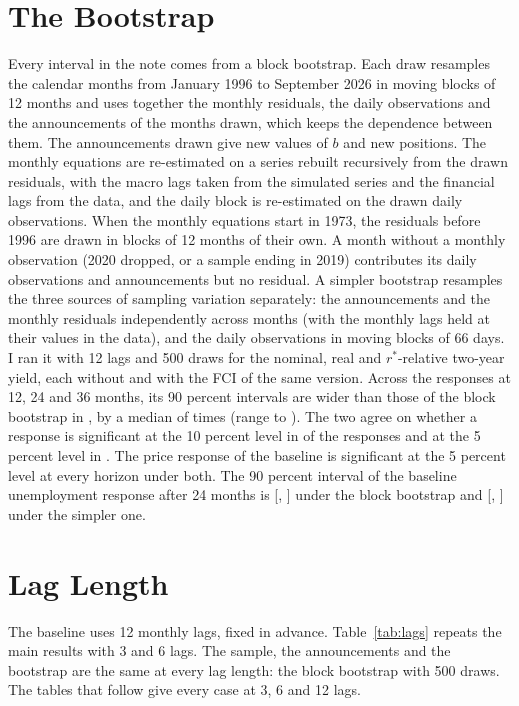 \documentclass[11pt]{article}
\newcommand{\rs}{r^{*}}
\begin{document}
\begin{appendices}
\section{The Bootstrap}\label{app:boot}
Every interval in the note comes from a block bootstrap. Each draw resamples the calendar months from January 1996 to September 2026 in moving blocks of 12 months and uses together the monthly residuals, the daily observations and the announcements of the months drawn, which keeps the dependence between them. The announcements drawn give new values of $b$ and new positions. The monthly equations are re-estimated on a series rebuilt recursively from the drawn residuals, with the macro lags taken from the simulated series and the financial lags from the data, and the daily block is re-estimated on the drawn daily observations. When the monthly equations start in 1973, the residuals before 1996 are drawn in blocks of 12 months of their own. A month without a monthly observation (2020 dropped, or a sample ending in 2019) contributes its daily observations and announcements but no residual. A simpler bootstrap resamples the three sources of sampling variation separately: the announcements and the monthly residuals independently across months (with the monthly lags held at their values in the data), and the daily observations in moving blocks of 66 days. I ran it with 12 lags and 500 draws for the nominal, real and $\rs$-relative two-year yield, each without and with the FCI of the same version. Across the  responses at 12, 24 and 36 months, its 90 percent intervals are wider than those of the block bootstrap in , by a median of  times (range  to ). The two agree on whether a response is significant at the 10 percent level in  of the  responses and at the 5 percent level in . The price response of the baseline is significant at the 5 percent level at every horizon under both. The 90 percent interval of the baseline unemployment response after 24 months is [, ] under the block bootstrap and [, ] under the simpler one.

\FloatBarrier
\section{Lag Length}\label{app:lags}
The baseline uses 12 monthly lags, fixed in advance. Table~\ref{tab:lags} repeats the main results with 3 and 6 lags. The sample, the announcements and the bootstrap are the same at every lag length: the block bootstrap with 500 draws. The tables that follow give every case at 3, 6 and 12 lags.


\end{appendices}
\end{document}
